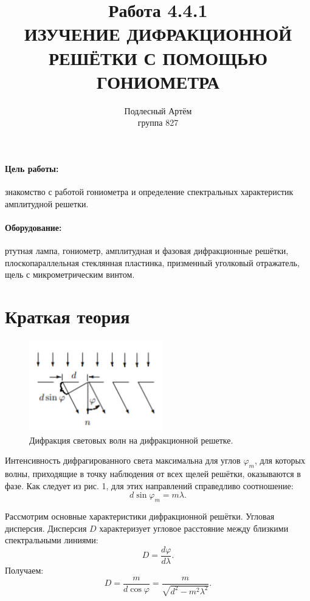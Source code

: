 \documentclass[a4paper, 14pt]{extarticle}%
\author{Подлесный Артём \\ группа 827}
\title{Работа 4.4.1 \\ ИЗУЧЕНИЕ ДИФРАКЦИОННОЙ
РЕШЁТКИ С ПОМОЩЬЮ ГОНИОМЕТРА}
\newcommand\ECaption[1]{%
     \captionsetup{font=footnotesize}%
     \caption{#1}}
\begin{document}
\maketitle

\paragraph*{Цель работы:} знакомство с работой гониометра и определение спектральных характеристик амплитудной решетки.
\paragraph*{Оборудование:} ртутная лампа, гониометр, амплитудная
и фазовая дифракционные решётки, плоскопараллельная стеклянная
пластинка, призменный уголковый отражатель, щель с микрометрическим винтом.

\section*{Краткая теория}

\begin{figure}
\begin{center}
\includegraphics[height=4cm]{teor1.png}
\end{center}
\ECaption{Дифракция световых волн на дифракционной решетке.}
\end{figure}

Интенсивность дифрагированного света максимальна для углов $\varphi_m$, для которых волны, приходящие в точку наблюдения от всех
щелей решётки, оказываются в фазе.
Как следует из рис. 1, для этих направлений справедливо соотношение:
\begin{equation}
d\sin \varphi_m = m\lambda.
\end{equation}

Рассмотрим основные
характеристики дифракционной решётки.
Угловая дисперсия. Дисперсия $D$
характеризует угловое расстояние
между близкими спектральными линиями:
\[D = \dfrac{d\varphi}{d\lambda}.\]
Получаем:
\begin{equation}
D = \dfrac{m}{d\cos\varphi} = \dfrac{m}{\sqrt{d^2 - m^2\lambda^2}}.
\end{equation}
\end{document}
